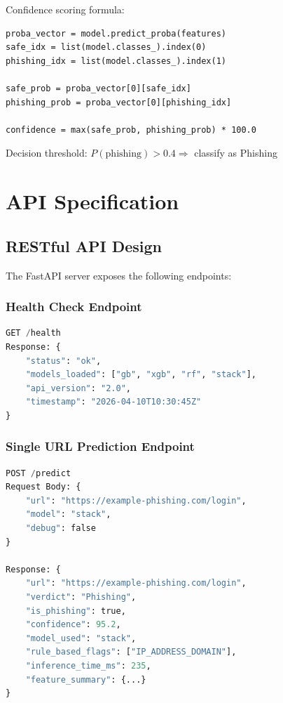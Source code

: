 \documentclass[12pt,a4paper]{report}
\begin{document}
Confidence scoring formula:
\begin{verbatim}
proba_vector = model.predict_proba(features)
safe_idx = list(model.classes_).index(0)
phishing_idx = list(model.classes_).index(1)

safe_prob = proba_vector[0][safe_idx]
phishing_prob = proba_vector[0][phishing_idx]

confidence = max(safe_prob, phishing_prob) * 100.0
\end{verbatim}

Decision threshold: $P(\text{phishing}) > 0.4 \Rightarrow$ classify as Phishing

\chapter{API Specification}

\section{RESTful API Design}

The FastAPI server exposes the following endpoints:

\subsection{Health Check Endpoint}

\begin{lstlisting}[language=python]
GET /health
Response: {
    "status": "ok",
    "models_loaded": ["gb", "xgb", "rf", "stack"],
    "api_version": "2.0",
    "timestamp": "2026-04-10T10:30:45Z"
}
\end{lstlisting}

\subsection{Single URL Prediction Endpoint}

\begin{lstlisting}[language=python]
POST /predict
Request Body: {
    "url": "https://example-phishing.com/login",
    "model": "stack",
    "debug": false
}

Response: {
    "url": "https://example-phishing.com/login",
    "verdict": "Phishing",
    "is_phishing": true,
    "confidence": 95.2,
    "model_used": "stack",
    "rule_based_flags": ["IP_ADDRESS_DOMAIN"],
    "inference_time_ms": 235,
    "feature_summary": {...}
}
\end{lstlisting}
\end{document}
